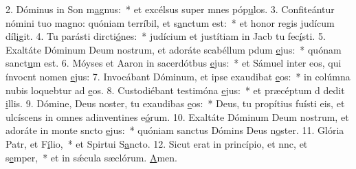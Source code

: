 2. Dóminus in Son m\uline{a}gnus:~* et excélsus super mnes póp\uline{u}los.
3. Confiteántur nómini tuo magno: quóniam terríbil, et s\uline{a}nctum est:~* et honor regis judícum díl\uline{i}git.
4. Tu parásti dircti\uline{ó}nes:~* judícium et justítiam in Jacb tu fec\uline{í}sti.
5. Exaltáte Dóminum Deum nostrum, et adoráte scabéllum pdum \uline{e}jus:~* quónam sanct\uline{u}m est.
6. Móyses et Aaron in sacerdótbus \uline{e}jus:~* et Sámuel inter eos, qui ínvocnt nomen \uline{e}jus:
7. Invocábant Dóminum, et ipse exaudibat \uline{e}os:~* in colúmna nubis loquebtur ad \uline{e}os.
8. Custodiébant testimóna \uline{e}jus:~* et præcéptum d dedit \uline{i}llis.
9. Dómine, Deus noster, tu exaudibas \uline{e}os:~* Deus, tu propítius fuísti eis, et ulcíscens in omnes adinventines e\uline{ó}rum.
10. Exaltáte Dóminum Deum nostrum, et adoráte in monte sncto \uline{e}jus:~* quóniam sanctus Dómins Deus n\uline{o}ster.
11. Glória Patr, et F\uline{í}lio,~* et Spirtui S\uline{a}ncto.
12. Sicut erat in princípio, et nnc, et s\uline{e}mper,~* et in sǽcula sæclórum. \uline{A}men.
